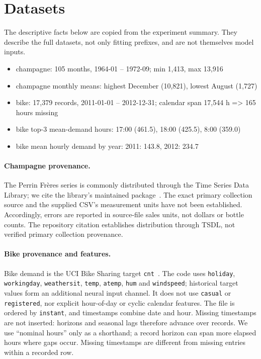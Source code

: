 \documentclass[10pt,a4paper]{article}
\begin{document}
\section{Datasets}
The descriptive facts below are copied from the experiment summary. They describe the full datasets, not only fitting prefixes, and are not themselves model inputs.
\begin{itemize}[leftmargin=*]
\item champagne: 105 months, 1964-01 -- 1972-09; min 1,413, max 13,916
\item champagne monthly means: highest December (10,821), lowest August (1,727)
\item bike: 17,379 records, 2011-01-01 -- 2012-12-31; calendar span 17,544 h => 165 hours missing
\item bike top-3 mean-demand hours: 17:00 (461.5), 18:00 (425.5), 8:00 (359.0)
\item bike mean hourly demand by year: 2011: 143.8, 2012: 234.7\end{itemize}

\paragraph{Champagne provenance.} The Perrin Fr\`eres series is commonly distributed through the Time Series Data Library; we cite the library's maintained package~\cite{tsdl}. The exact primary collection source and the supplied CSV's measurement units have not been established. Accordingly, errors are reported in source-file sales units, not dollars or bottle counts. The repository citation establishes distribution through TSDL, not verified primary collection provenance.

\paragraph{Bike provenance and features.} Bike demand is the UCI Bike Sharing target \texttt{cnt}~\cite{bike}. The code uses \texttt{holiday}, \texttt{workingday}, \texttt{weathersit}, \texttt{temp}, \texttt{atemp}, \texttt{hum} and \texttt{windspeed}; historical target values form an additional neural input channel. It does not use \texttt{casual} or \texttt{registered}, nor explicit hour-of-day or cyclic calendar features. The file is ordered by \texttt{instant}, and timestamps combine date and hour. Missing timestamps are not inserted: horizons and seasonal lags therefore advance over records. We use ``nominal hours'' only as a shorthand; a record horizon can span more elapsed hours where gaps occur. Missing timestamps are different from missing entries within a recorded row.
\end{document}
